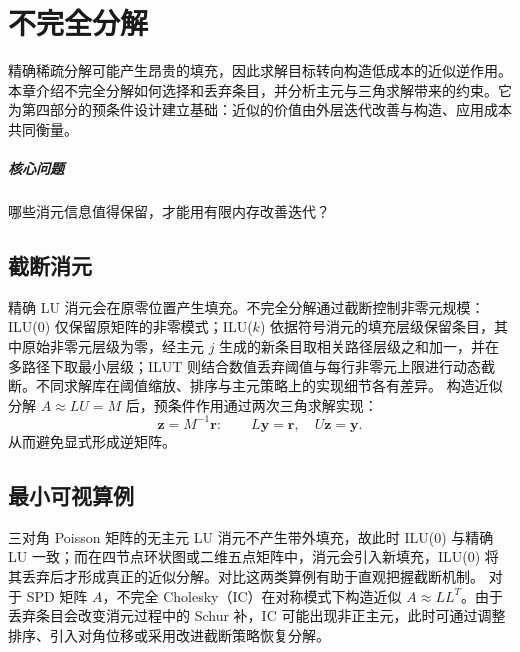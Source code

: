 \chapter{不完全分解}\label{v0ch:8}
\begin{chaptersummary}
精确稀疏分解可能产生昂贵的填充，因此求解目标转向构造低成本的近似逆作用。本章介绍不完全分解如何选择和丢弃条目，并分析主元与三角求解带来的约束。它为第四部分的预条件设计建立基础：近似的价值由外层迭代改善与构造、应用成本共同衡量。
\end{chaptersummary}
\paragraph{核心问题}哪些消元信息值得保留，才能用有限内存改善迭代？

\section{截断消元}
精确 LU 消元会在原零位置产生填充。不完全分解通过截断控制非零元规模：ILU(0) 仅保留原矩阵的非零模式；ILU($k$) 依据符号消元的填充层级保留条目，其中原始非零元层级为零，经主元 $j$ 生成的新条目取相关路径层级之和加一，并在多路径下取最小层级；ILUT 则结合数值丢弃阈值与每行非零元上限进行动态截断。不同求解库在阈值缩放、排序与主元策略上的实现细节各有差异。
构造近似分解 $A\approx LU=M$ 后，预条件作用通过两次三角求解实现：
\[
 \bm z=M^{-1}\bm r:\qquad L\bm y=\bm r,\quad U\bm z=\bm y.
\]
从而避免显式形成逆矩阵。
\section{最小可视算例}
三对角 Poisson 矩阵的无主元 LU 消元不产生带外填充，故此时 ILU(0) 与精确 LU 一致；而在四节点环状图或二维五点矩阵中，消元会引入新填充，ILU(0) 将其丢弃后才形成真正的近似分解。对比这两类算例有助于直观把握截断机制。
对于 SPD 矩阵 $A$，不完全 Cholesky（IC）在对称模式下构造近似 $A\approx LL^T$。由于丢弃条目会改变消元过程中的 Schur 补，IC 可能出现非正主元，此时可通过调整排序、引入对角位移或采用改进截断策略恢复分解。
